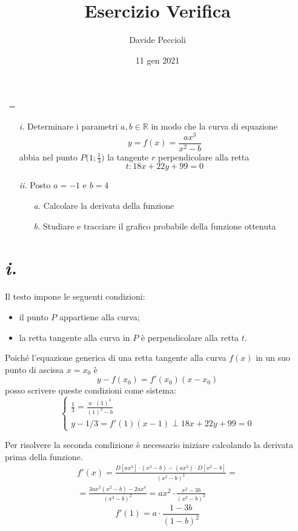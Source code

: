 \documentclass[a4paper, oneside]{article}
\title{Esercizio Verifica}
\date{11 gen 2021}
\author{Davide Peccioli}
\makeatletter
\newlength\sidebar
\newlength\envborder
\def\esefcolorbox#1#{\esecolor@fbox{#1}}
\def\esecolor@fbox#1#2#3{%
		  \color@b@x{\fboxsep\z@\color#1{#2}\fboxs}{\color#1{#3}}}
\newenvironment{eseframed}{%
		  \def\FrameCommand{\fboxrule=\the\sidebar  \fboxsep=\the\envborder%
		  \esefcolorbox{exampleborder}{examplebg}}%
		  \MakeFramed{\FrameRestore}}%
		 {\endMakeFramed}
\newenvironment{nota}[1]
		{\par\medskip%
		\hbox{%
		\fboxsep=\the\sidebar\hspace{-\envborder}\hspace{-.5\sidebar}%
		\colorbox{exampleborder}{%
		\hspace{\envborder}\footnotesize\sffamily\bfseries%
		\textcolor{white}{{{\large
		#1}}\hspace{\envborder}}
		}
		}
		\nointerlineskip\vspace{-\topsep}%
		\begin{eseframed}\noindent\ignorespaces%
		}
		{\end{eseframed}\vspace{-\baselineskip}\medskip}
\newcounter{i}%
\newcounter{n}%
\newcounter{I}%
\newcommand{\R}{\mathbb{R}}
\makeatother
\begin{document}
 	\maketitle
	
	\begin{nota}{Testo}
	\begin{itemize}
	\item[\textit{i.}] Determinare i parametri $a, b\in\R$ in modo che la curva di equazione $$\displaystyle y=f(x)=\frac{ax^3}{x^2-b}$$ abbia nel punto $P\Big(1; \frac{1}{3}\Big)$ la tangente $r$ perpendicolare alla retta $$t: 18x+22y+99=0$$
	\item[\textit{ii.}] Posto $a=-1$ e $b=4$
		\begin{itemize}
		\item [\textit{a.}] Calcolare la derivata della funzione
		\item[\textit{b.}] Studiare e tracciare il grafico probabile della funzione ottenuta
		\end{itemize}
	\end{itemize}
	\end{nota}
	
	\section*{\textit{i.}}
	
	Il testo impone le seguenti condizioni:
	\begin{itemize}
	\item il punto $P$ appartiene alla curva;
	\item la retta tangente alla curva in $P$ è perpendicolare alla retta $t$.
	\end{itemize}
	Poiché l'equazione generica di una retta tangente alla curva $f(x)$ in un suo punto di ascissa $x=x_0$ è 
	\[
	y-f(x_0)=f'(x_0)(x-x_0)
	\]
	posso scrivere queste condizioni come sistema:
	\begin{equation*}
		\begin{cases}
		\displaystyle\frac{1}{3}=\frac{a\cdot(1)^3}{(1)^2-b}\\
		y-1/3=f'(1)(x-1)\perp 18x+22y+99=0
		\end{cases}
	\end{equation*}
	
	Per risolvere la seconda condizione è necessario iniziare calcolando la derivata prima della funzione.
	\begin{multline*}
		f'(x)=\frac{D[ax^3]\cdot(x^2-b)-(ax^3)\cdot D[x^2-b]}{(x^2-b)^2}=\\
		=\frac{3ax^2(x^2-b)-2ax^4}{(x^2-b)^2}=ax^2\cdot\frac{x^2-3b}{(x^2-b)^2}
	\end{multline*}
	\[
	f'(1)=a\cdot\frac{1-3b}{(1-b)^2}
	\]
	
\end{document}
